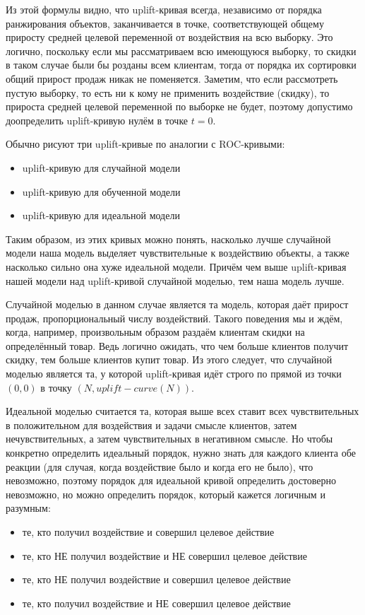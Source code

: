 Из этой формулы видно, что uplift-кривая всегда, независимо от порядка ранжирования объектов, заканчивается в точке, соответствующей общему приросту средней целевой переменной от воздействия на всю выборку. Это логично, поскольку если мы рассматриваем всю имеющуюся выборку, то скидки в таком случае были бы розданы всем клиентам, тогда от порядка их сортировки общий прирост продаж никак не поменяется. Заметим, что если рассмотреть пустую выборку, то есть ни к кому не применить воздействие (скидку), то прироста средней целевой переменной по выборке не будет, поэтому допустимо доопределить uplift-кривую нулём в точке $t=0$.

Обычно рисуют три uplift-кривые по аналогии с ROC-кривыми:
\begin{itemize}
    \item uplift-кривую для случайной модели
    \item uplift-кривую для обученной модели
    \item uplift-кривую для идеальной модели
\end{itemize}

Таким образом, из этих кривых можно понять, насколько лучше случайной модели наша модель выделяет чувствительные к воздействию объекты, а также насколько сильно она хуже идеальной модели. Причём чем выше uplift-кривая нашей модели над uplift-кривой случайной моделью, тем наша модель лучше.

Случайной моделью в данном случае является та модель, которая даёт прирост продаж, пропорциональный числу воздействий. Такого поведения мы и ждём, когда, например, произвольным образом раздаём клиентам скидки на определённый товар. Ведь логично ожидать, что чем больше клиентов получит скидку, тем больше клиентов купит товар. Из этого следует, что случайной моделью является та, у которой uplift-кривая идёт строго по прямой из точки $(0,0)$ в точку $(N, uplift-curve(N))$.

Идеальной моделью считается та, которая выше всех ставит всех чувствительных в положительном для воздействия и задачи смысле клиентов, затем нечувствительных, а затем чувствительных в негативном смысле. Но чтобы конкретно определить идеальный порядок, нужно знать для каждого клиента обе реакции (для случая, когда воздействие было и когда его не было), что невозможно, поэтому порядок для идеальной кривой определить достоверно невозможно, но можно определить порядок, который кажется логичным и разумным:
\begin{itemize}
    \item те, кто получил воздействие и совершил целевое действие
    \item те, кто НЕ получил воздействие и НЕ совершил целевое действие
    \item те, кто НЕ получил воздействие и совершил целевое действие
    \item те, кто получил воздействие и НЕ совершил целевое действие
\end{itemize}

